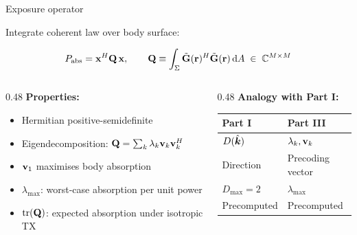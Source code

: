 \begin{frame}{Exposure operator}

  Integrate coherent law over body surface:

  \begin{resultbox}
    \vspace{-6pt}
    \[
      P_{\mathrm{abs}} = \mathbf{x}^H \mathbf{Q}\, \mathbf{x},
      \qquad
      \mathbf{Q} \equiv \int_\Sigma \tilde{\mathbf{G}}(\mathbf{r})^H \tilde{\mathbf{G}}(\mathbf{r})\,\mathrm{d} A
      \;\in\; \mathbb{C}^{M \times M}
    \]
  \end{resultbox}

  \vspace{6pt}
  \begin{columns}[T]
    \begin{column}{0.48\textwidth}
      \textbf{Properties:}
      \begin{itemize}
        \item Hermitian positive-semidefinite
        \item Eigendecomposition: $\mathbf{Q} = \sum_k \lambda_k \mathbf{v}_k \mathbf{v}_k^H$
        \item $\mathbf{v}_1$ maximises body absorption
        \item $\lambda_{\max}$: worst-case absorption per unit power
        \item $\operatorname{tr}(\mathbf{Q})$: expected absorption under isotropic TX
      \end{itemize}
    \end{column}

    \begin{column}{0.48\textwidth}
      \textbf{Analogy with Part I:}

      \vspace{4pt}
      {\small
      \begin{tabular}{ll}
        \toprule
        Part I & Part III \\
        \midrule
        $D(\hat{\bm{k}})$ & $\lambda_k, \mathbf{v}_k$ \\
        Direction & Precoding vector \\
        $D_{\max} = 2$ & $\lambda_{\max}$ \\
        Precomputed & Precomputed \\
        \bottomrule
      \end{tabular}
      }
    \end{column}
  \end{columns}
\end{frame}

